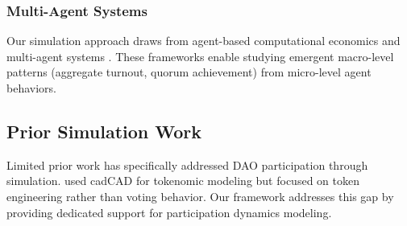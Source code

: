 \subsubsection{Multi-Agent Systems}

Our simulation approach draws from agent-based computational economics \citep{tesfatsion2006handbook} and multi-agent systems \citep{wooldridge2009introduction}. These frameworks enable studying emergent macro-level patterns (aggregate turnout, quorum achievement) from micro-level agent behaviors.

\subsection{Prior Simulation Work}

Limited prior work has specifically addressed DAO participation through simulation. \citet{faqir2021cadcad} used cadCAD for tokenomic modeling but focused on token engineering rather than voting behavior. Our framework addresses this gap by providing dedicated support for participation dynamics modeling.
